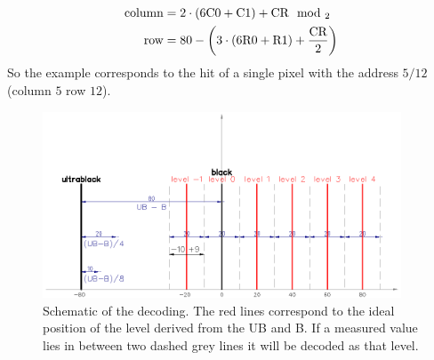 \documentclass[british,11pt,a4paper]{memoir}
\begin{document}
\begin{align}
	\text{column} &= 	2\cdot\left(  6\text{C}0 + \text{C}1 \right) + \text{CR}\mod_{2}\\
	\text{row} &= 80 - \left( 3\cdot\left(  6\text{R}0 + \text{R}1 \right) + \frac{\text{CR}}{2}\right)
\end{align}
So the example corresponds to the hit of a single pixel with the address $5/12$ (column $5$ row $12$).
\begin{figure}[ht]
	\includegraphics[width=0.95\textwidth]{decode}
	\caption{Schematic of the decoding. The red lines correspond to the ideal position of the level derived from the \ac{UB} and \ac{B}. If a measured value lies in between two dashed grey lines it will be decoded as that level.}
	\label{p15}
\end{figure}

\end{document}
